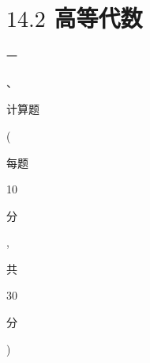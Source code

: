 \documentclass[10pt]{article}
\begin{document}
\section{$14.2$ 高等代数}
\begin{CJK}{UTF8}{mj}一\end{CJK}、\begin{CJK}{UTF8}{mj}计算题\end{CJK} (\begin{CJK}{UTF8}{mj}每题\end{CJK} 10 \begin{CJK}{UTF8}{mj}分\end{CJK}, \begin{CJK}{UTF8}{mj}共\end{CJK} 30 \begin{CJK}{UTF8}{mj}分\end{CJK})
\end{document}
